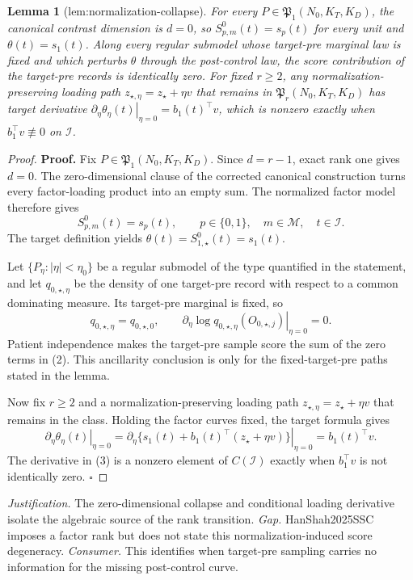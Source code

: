 \documentclass{article}
\newtheorem{lemma}{Lemma}
\begin{document}
\begin{lemma}[lem:normalization-collapse]\label{lem:normalization-collapse}
For every \(P\in\mathfrak P_1(N_0,K_T,K_D)\), the canonical contrast dimension is \(d=0\), so \(S^0_{p,m}(t)=s_p(t)\) for every unit and \(\theta(t)=s_1(t)\). Along every regular submodel whose target-pre marginal law is fixed and which perturbs \(\theta\) through the post-control law, the score contribution of the target-pre records is identically zero. For fixed \(r\ge2\), any normalization-preserving loading path \(z_{\star,\eta}=z_\star+\eta v\) that remains in \(\mathfrak P_r(N_0,K_T,K_D)\) has target derivative \(\left.\partial_\eta\theta_\eta(t)\right|_{\eta=0}=b_1(t)^\top v\), which is nonzero exactly when \(b_1^\top v\not\equiv0\) on \(\mathcal I\).
\end{lemma}
\begin{proof}
\textbf{Proof.}
Fix \(P\in\mathfrak P_1(N_0,K_T,K_D)\). Since \(d=r-1\), exact rank one gives \(d=0\). The zero-dimensional clause of the corrected canonical construction turns every factor-loading product into an empty sum. The normalized factor model therefore gives
\[
 S^0_{p,m}(t)=s_p(t),
 \qquad p\in\{0,1\},\quad m\in\mathcal M,\quad t\in\mathcal I. \tag{1}
\]
The target definition yields \(\theta(t)=S^0_{1,\star}(t)=s_1(t)\).

Let \(\{P_\eta:|\eta|<\eta_0\}\) be a regular submodel of the type quantified in the statement, and let \(q_{0,\star,\eta}\) be the density of one target-pre record with respect to a common dominating measure. Its target-pre marginal is fixed, so
\[
 q_{0,\star,\eta}=q_{0,\star,0},
 \qquad
 \left.\partial_\eta\log q_{0,\star,\eta}(O_{0,\star,j})
 \right|_{\eta=0}=0.                                    \tag{2}
\]
Patient independence makes the target-pre sample score the sum of the zero terms in (2). This ancillarity conclusion is only for the fixed-target-pre paths stated in the lemma.

Now fix \(r\ge2\) and a normalization-preserving loading path \(z_{\star,\eta}=z_\star+\eta v\) that remains in the class. Holding the factor curves fixed, the target formula gives
\[
 \left.\partial_\eta\theta_\eta(t)\right|_{\eta=0}
 =\left.\partial_\eta
 \{s_1(t)+b_1(t)^\top(z_\star+\eta v)\}\right|_{\eta=0}
 =b_1(t)^\top v.                                        \tag{3}
\]
The derivative in (3) is a nonzero element of \(C(\mathcal I)\) exactly when \(b_1^\top v\) is not identically zero. \(\square\)
\end{proof}
\par\smallskip\noindent \textit{Justification.} The zero-dimensional collapse and conditional loading derivative isolate the algebraic source of the rank transition. \textit{Gap.} HanShah2025SSC imposes a factor rank but does not state this normalization-induced score degeneracy. \textit{Consumer.} This identifies when target-pre sampling carries no information for the missing post-control curve.
\end{document}
